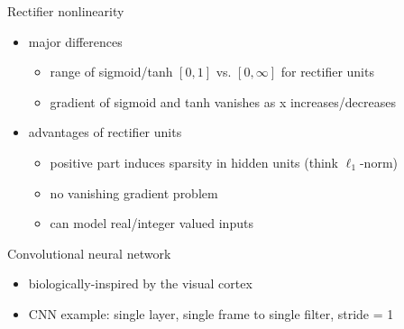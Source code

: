 \begin{frame}{Rectifier nonlinearity}
    \begin{itemize}\itemsep=12pt

        \item major differences
        \vspace*{0.5em}
        \begin{itemize}
            \item range of sigmoid/tanh $[0,1]$ vs. $[0,\infty]$ for rectifier units
            \item gradient of sigmoid and tanh vanishes as x increases/decreases
        \end{itemize}

        \item advantages of rectifier units \cite{JKRL:09,NH:10}
        \vspace*{0.5em}
        \begin{itemize}
            \item positive part induces sparsity in hidden units (think $\ell_{1}$-norm)
            \item no vanishing gradient problem
            \item can model real/integer valued inputs
        \end{itemize}

    \end{itemize}
\end{frame}

\begin{frame}{Convolutional neural network}
    \begin{itemize}\itemsep=12pt

        \item biologically-inspired by the visual cortex

        \item CNN example: single layer, single frame to single filter, stride = 1

    \end{itemize}
    \begin{minipage}{\textwidth}
        \centering
    \end{minipage}
\end{frame}

